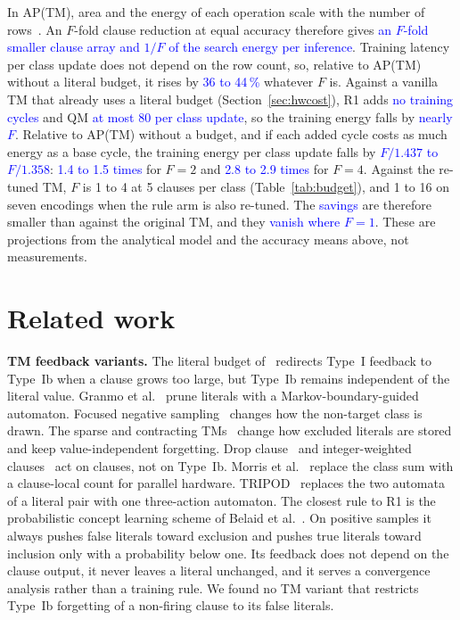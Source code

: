 \documentclass[preprint,12pt,times]{elsarticle}
\newcommand{\proj}[1]{\textcolor{blue}{#1}}
\newcommand{\add}[1]{{\color{blue}#1}}
\begin{document}
In AP(TM), area and the energy of each operation scale with the number of rows~\cite{shrot2026aptm}.
An $F$-fold clause reduction at equal accuracy therefore gives \proj{an $F$-fold smaller clause array and $1/F$ of the search energy per inference}.
Training latency per class update does not depend on the row count, so, relative to AP(TM) without a literal budget, it rises by \proj{36 to 44\,\%} whatever $F$ is.
Against a vanilla TM that already uses a literal budget (Section~\ref{sec:hwcost}), R1 adds \proj{no training cycles} and QM \proj{at most 80 per class update}, so the training energy falls by \proj{nearly $F$}.
Relative to AP(TM) without a budget, and if each added cycle costs as much energy as a base cycle, the training energy per class update falls by \proj{$F/1.437$ to $F/1.358$}: \proj{1.4 to 1.5 times} for $F = 2$ and \proj{2.8 to 2.9 times} for $F = 4$.
Against the re-tuned TM, $F$ is 1 to 4 at 5 clauses per class (Table~\ref{tab:budget})\add{, and 1 to 16 on seven encodings when the rule arm is also re-tuned}. The \proj{savings} are therefore smaller than against the original TM, and they \proj{vanish where $F = 1$}.
These are projections from the analytical model and the accuracy means above, not measurements.

\section{Related work}
\label{sec:related}

\textbf{TM feedback variants.}
The literal budget of~\cite{abeyrathna2023csc} redirects Type~I feedback to Type~Ib when a clause grows too large, but Type~Ib remains independent of the literal value.
Granmo et al.~\cite{granmo2023markov} prune literals with a Markov-boundary-guided automaton.
Focused negative sampling~\cite{glimsdal2022fns} changes how the non-target class is drawn.
The sparse and contracting TMs~\cite{ostby2024stm,bhattarai2023contracting} change how excluded literals are stored and keep value-independent forgetting.
Drop clause~\cite{sharma2023drop} and integer-weighted clauses~\cite{abeyrathna2020integer} act on clauses, not on Type~Ib.
Morris et al.~\cite{morris2022alternate} replace the class sum with a clause-local count for parallel hardware.
TRIPOD~\cite{rudin2026tripod} replaces the two automata of a literal pair with one three-action automaton.
The closest rule to R1 is the probabilistic concept learning scheme of Belaid et al.~\cite{belaid2025pcl}.
On positive samples it always pushes false literals toward exclusion and pushes true literals toward inclusion only with a probability below one. Its feedback does not depend on the clause output, it never leaves a literal unchanged, and it serves a convergence analysis rather than a training rule.
We found no TM variant that restricts Type~Ib forgetting of a non-firing clause to its false literals.
\end{document}

